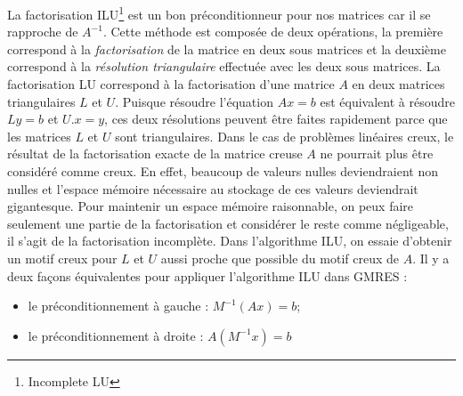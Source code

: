 La factorisation ILU\footnote{Incomplete LU} est un bon préconditionneur pour nos matrices car il se rapproche de $A^{-1}$.
%
Cette méthode est composée de deux opérations, la première correspond à la {\em factorisation} de la matrice en deux sous matrices et la deuxième correspond à la {\em résolution triangulaire} effectuée avec les deux sous matrices.
%
La factorisation LU correspond à la factorisation d'une matrice $A$ en deux matrices triangulaires $L$ et $U$.
%
Puisque résoudre l'équation $Ax=b$ est équivalent à résoudre $Ly=b$ et $U.x=y$, ces deux résolutions peuvent être faites rapidement parce que les matrices $L$ et $U$ sont triangulaires.
%
Dans le cas de problèmes linéaires creux, le résultat de la factorisation exacte de la matrice creuse $A$ ne pourrait plus être considéré comme creux.
%
En effet, beaucoup de valeurs nulles deviendraient non nulles et l'espace mémoire nécessaire au stockage de ces valeurs deviendrait gigantesque.
%
Pour maintenir un espace mémoire raisonnable, on peux faire seulement une partie de la factorisation et considérer le reste comme négligeable, il s'agit de la factorisation incomplète.
%
Dans l'algorithme ILU, on essaie d'obtenir un motif creux pour $L$ et $U$ aussi proche que possible du motif creux de $A$.
%
Il y a deux façons équivalentes pour appliquer l'algorithme ILU dans GMRES :
\begin{itemize}
  \item le préconditionnement à gauche : $M^{-1}(Ax)=b$;
  \item le préconditionnement à droite : $A(M^{-1}x)=b$
\end{itemize}
%
